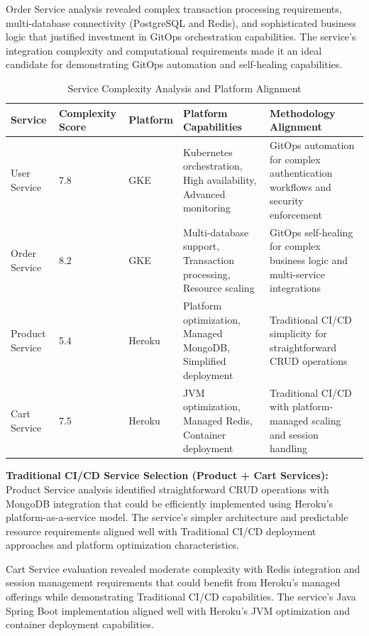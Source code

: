 Order Service analysis revealed complex transaction processing requirements, multi-database connectivity (PostgreSQL and Redis), and sophisticated business logic that justified investment in GitOps orchestration capabilities. The service's integration complexity and computational requirements made it an ideal candidate for demonstrating GitOps automation and self-healing capabilities.

\begin{table}[H]
\centering
\caption{Service Complexity Analysis and Platform Alignment}
\label{tab:service-complexity-analysis}
\renewcommand{\arraystretch}{1.2}
\footnotesize
\begin{tabular}{|p{2.2cm}|p{1.8cm}|p{1.5cm}|p{3.8cm}|p{4.2cm}|}
\hline
\textbf{Service} & \textbf{Complexity Score} & \textbf{Platform} & \textbf{Platform Capabilities} & \textbf{Methodology Alignment} \\
\hline
User Service & 7.8 & GKE & Kubernetes orchestration, High availability, Advanced monitoring & GitOps automation for complex authentication workflows and security enforcement \\
\hline
Order Service & 8.2 & GKE & Multi-database support, Transaction processing, Resource scaling & GitOps self-healing for complex business logic and multi-service integrations \\
\hline
Product Service & 5.4 & Heroku & Platform optimization, Managed MongoDB, Simplified deployment & Traditional CI/CD simplicity for straightforward CRUD operations \\
\hline
Cart Service & 7.5 & Heroku & JVM optimization, Managed Redis, Container deployment & Traditional CI/CD with platform-managed scaling and session handling \\
\hline
\end{tabular}
\end{table}

\textbf{Traditional CI/CD Service Selection (Product + Cart Services):}
Product Service analysis identified straightforward CRUD operations with MongoDB integration that could be efficiently implemented using Heroku's platform-as-a-service model. The service's simpler architecture and predictable resource requirements aligned well with Traditional CI/CD deployment approaches and platform optimization characteristics.

Cart Service evaluation revealed moderate complexity with Redis integration and session management requirements that could benefit from Heroku's managed offerings while demonstrating Traditional CI/CD capabilities. The service's Java Spring Boot implementation aligned well with Heroku's JVM optimization and container deployment capabilities.

